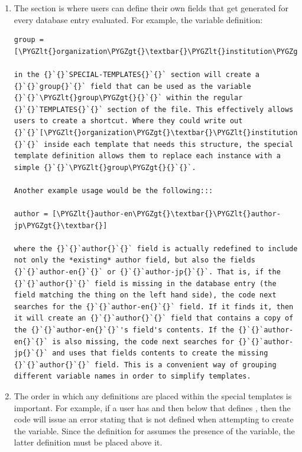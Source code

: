 \documentclass[letterpaper,10pt,english]{sphinxmanual}
\def\PYGZlt{\char`\<}
\def\PYGZgt{\char`\>}
\begin{document}
\begin{enumerate}
\item {} 
The  section is where users can define their own fields that get generated for every database entry evaluated. For example, the variable definition:

\begin{Verbatim}[commandchars=\\\{\}]
group = [\PYGZlt{}organization\PYGZgt{}\textbar{}\PYGZlt{}institution\PYGZgt{}\textbar{}\PYGZlt{}corporation\PYGZgt{}\textbar{}]

in the {}`{}`SPECIAL-TEMPLATES{}`{}` section will create a {}`{}`group{}`{}` field that can be used as the variable {}`{}`\PYGZlt{}group\PYGZgt{}{}`{}` within the regular {}`{}`TEMPLATES{}`{}` section of the file. This effectively allows users to create a shortcut. Where they could write out {}`{}`[\PYGZlt{}organization\PYGZgt{}\textbar{}\PYGZlt{}institution\PYGZgt{}\textbar{}\PYGZlt{}corporation\PYGZgt{}\textbar{}]{}`{}` inside each template that needs this structure, the special template definition allows them to replace each instance with a simple {}`{}`\PYGZlt{}group\PYGZgt{}{}`{}`.

Another example usage would be the following:::

author = [\PYGZlt{}author-en\PYGZgt{}\textbar{}\PYGZlt{}author-jp\PYGZgt{}\textbar{}]

where the {}`{}`author{}`{}` field is actually redefined to include not only the *existing* author field, but also the fields {}`{}`author-en{}`{}` or {}`{}`author-jp{}`{}`. That is, if the {}`{}`author{}`{}` field is missing in the database entry (the field matching the thing on the left hand side), the code next searches for the {}`{}`author-en{}`{}` field. If it finds it, then it will create an {}`{}`author{}`{}` field that contains a copy of the {}`{}`author-en{}`{}`'s field's contents. If the {}`{}`author-en{}`{}` is also missing, the code next searches for {}`{}`author-jp{}`{}` and uses that fields contents to create the missing {}`{}`author{}`{}` field. This is a convenient way of grouping different variable names in order to simplify templates.
\end{Verbatim}

\item {} 
The order in which any definitions are placed within the special templates is important. For example, if a user has  and then below that defines , then the code will issue an error stating that  is not defined when attempting to create the  variable. Since the definition for  assumes the presence of the  variable, the latter definition must be placed above it.

\end{enumerate}
\end{document}
